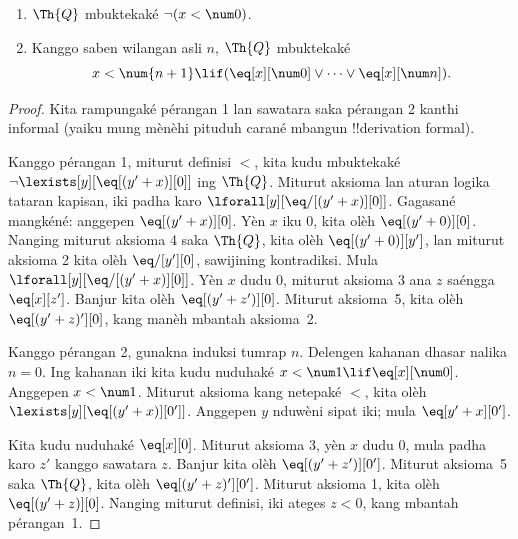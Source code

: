\documentclass[../../../include/open-logic-section]{subfiles}
\begin{document}
\begin{lem}
\begin{enumerate}
\item $\Th{Q}$ mbuktekaké $\lnot (x < \num 0)$.
\item Kanggo saben wilangan asli $n$, $\Th{Q}$ mbuktekaké
\[
x < \num {n+1} \lif (\eq[x][\num 0] \lor \dots \lor \eq[x][\num n]).
\]
\end{enumerate}
\end{lem}

\begin{proof}
Kita rampungaké pérangan 1 lan sawatara saka pérangan 2 kanthi
informal (yaiku mung mènèhi pituduh carané mbangun
!!{derivation} formal).

Kanggo pérangan 1, miturut definisi $<$, kita kudu mbuktekaké
$\lnot \lexists[y][\eq[(y'+x)][0]]$ ing $\Th{Q}$.
Miturut aksioma lan aturan logika tataran kapisan, iki padha
karo $\lforall[y][\eq/[(y' + x)][0]]$.
Gagasané mangkéné: anggepen $\eq[(y'+x)][0]$.
Yèn $x$ iku 0, kita olèh $\eq[(y' + 0)][0]$.
Nanging miturut aksioma 4 saka $\Th{Q}$, kita olèh
$\eq[(y' + 0)][y']$, lan miturut aksioma 2 kita olèh
$\eq/[y'][0]$, sawijining kontradiksi.
Mula $\lforall[y][\eq/[(y' +x)][0]]$.
Yèn $x$ dudu $0$, miturut aksioma 3 ana $z$ saéngga
$\eq[x][z']$. Banjur kita olèh $\eq[(y' + z')][0]$.
Miturut aksioma~5, kita olèh $\eq[(y' + z)'][0]$,
kang manèh mbantah aksioma~2.

Kanggo pérangan 2, gunakna induksi tumrap $n$.
Delengen kahanan dhasar nalika $n =0$.
Ing kahanan iki kita kudu nuduhaké
$x < \num 1 \lif \eq[x][\num 0]$.
Anggepen $x < \num 1$. Miturut aksioma kang netepaké $<$,
kita olèh $\lexists[y][\eq[(y'+x)][0']]$.
Anggepen $y$ nduwèni sipat iki; mula
$\eq[y'+x][0']$.

Kita kudu nuduhaké $\eq[x][0]$. Miturut aksioma 3,
yèn $x$ dudu 0, mula padha karo $z'$ kanggo sawatara $z$.
Banjur kita olèh $\eq[(y' + z')][0']$.
Miturut aksioma~5 saka $\Th{Q}$, kita olèh
$\eq[(y'+z)'][0']$. Miturut aksioma 1, kita olèh
$\eq[(y' + z)][0]$. Nanging miturut definisi,
iki ateges $z < 0$, kang mbantah pérangan~1.
\end{proof}
\end{document}

